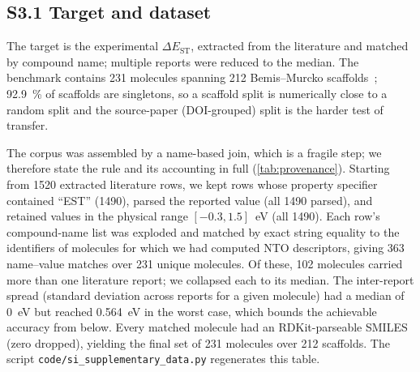 \documentclass[twoside,twocolumn,9pt]{extarticle}
\begin{document}
\subsection*{S3.1 Target and dataset}
The target is the experimental $\Delta E_\text{ST}$, extracted from the
literature and matched by compound name; multiple reports were reduced to the
median. The benchmark contains \num{231} molecules spanning \num{212}
Bemis--Murcko scaffolds~\cite{Bemis1996}; \qty{92.9}{\percent} of scaffolds are
singletons, so a scaffold split is numerically close to a random split and the
source-paper (DOI-grouped) split is the harder test of transfer.

The corpus was assembled by a name-based join, which is a fragile step; we therefore
state the rule and its accounting in full (\cref{tab:provenance}). Starting from
\num{1520} extracted literature rows, we kept rows whose property specifier
contained ``EST'' (\num{1490}), parsed the reported value (all \num{1490} parsed),
and retained values in the physical range $[-0.3, 1.5]$~eV (all \num{1490}). Each
row's compound-name list was exploded and matched by exact string equality to the
identifiers of molecules for which we had computed NTO descriptors, giving
\num{363} name--value matches over \num{231} unique molecules. Of these,
\num{102} molecules carried more than one literature report; we collapsed each to
its median. The inter-report spread (standard deviation across reports for a given
molecule) had a median of \qty{0}{\electronvolt} but reached
\qty{0.564}{\electronvolt} in the worst case, which bounds the achievable accuracy
from below. Every matched molecule had an RDKit-parseable SMILES (zero dropped),
yielding the final set of \num{231} molecules over \num{212} scaffolds. The script
\texttt{code/si\_supplementary\_data.py} regenerates this table.
\end{document}
